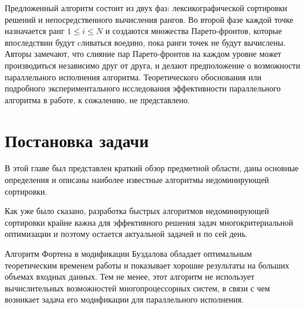 Предложенный алгоритм состоит из двух фаз: лексикографической сортировки решений и непосредственного вычисления рангов.
Во второй фазе каждой точке назначается ранг $1\leq i \leq N$ и создаются множества Парето-фронтов, которые впоследствии будут cливаться воедино, пока ранги точек не будут вычислены.
Авторы замечают, что слияние пар Парето-фронтов на каждом уровне может производиться независимо друг от друга, и делают предположение о возможности параллельного исполнения алгоритма.
Теоретического обоснования или подробного экспериментального исследования эффективности параллельного алгоритма в работе, к сожалению, не представлено.

\section{Постановка задачи}
В этой главе был представлен краткий обзор предметной области, даны основные определения и описаны наиболее известные алгоритмы недоминирующей сортировки.

Как уже было сказано, разработка быстрых алгоритмов недоминирующей сортировки крайне важна для эффективного решения задач многокритериальной оптимизации и поэтому остается актуальной задачей и по сей день.

Алгоритм Фортена в модификации Буздалова обладает оптимальным теоретическим временем работы и показывает хорошие результаты на больших объемах входных данных.
Тем не менее, этот алгоритм не использует вычислительных возможностей многопроцессорных систем, в связи с чем возникает задача его модификации для параллельного исполнения.
